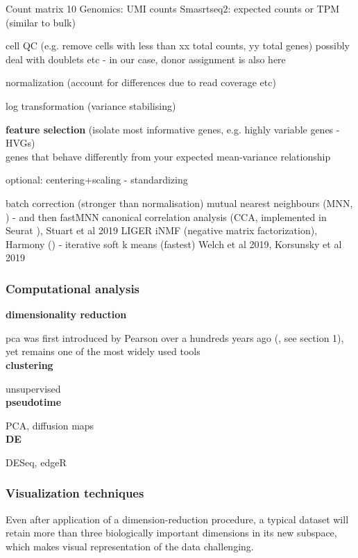 Count matrix
10 Genomics: UMI counts
Smasrtseq2: expected counts or TPM (similar to bulk)

cell QC (e.g. remove cells with less than xx total counts, yy total genes)
possibly deal with doublets etc - in our case, donor assignment is also here

normalization (account for differences due to read coverage etc)

log transformation (variance stabilising)

\textbf{feature selection} (isolate most informative genes, e.g. highly variable genes - HVGs)\\

genes that behave differently from your expected mean-variance relationship

optional: centering+scaling - standardizing

batch correction (stronger than normalisation) 
mutual nearest neighbours (MNN, \cite{haghverdi2018batch}) - and then fastMNN
canonical correlation analysis (CCA, implemented in Seurat \cite{butler2018integrating}), Stuart et al 2019
LIGER iNMF (negative matrix factorization),
Harmony (\cite{nowotschin2019emergent}) - iterative soft k means (fastest)
Welch et al 2019, Korsunsky et al 2019


\subsubsection{Computational analysis}

\textbf{dimensionality reduction}

\gls{pca} was first introduced by Pearson over a hundreds years ago (\cite{}, see section 1), yet remains one of the most widely used tools \\

\textbf{clustering}

unsupervised\\

\textbf{pseudotime}

PCA, diffusion maps\\

\textbf{DE}

DESeq, edgeR



\subsubsection{Visualization techniques}

Even after application of a dimension-reduction procedure, a typical dataset will retain more than three biologically important dimensions in its new subspace, which makes visual representation of the data challenging. 

